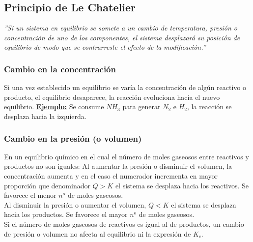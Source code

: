     \subsection{Principio de Le Chatelier}
        \sangria{} \textit{''Si un sistema en equilibrio se somete a un cambio de temperatura, presión o concentración de uno de los componentes, el sistema desplazará su posición de equilibrio de modo que se contrarreste el efecto de la modificación.''} 
        \subsubsection{Cambio en la concentración}
         \sangria{} Si una vez establecido un equilibrio se varía la concentración de algún reactivo o producto, el equilibrio desaparece, la reacción evoluciona hacía el nuevo equilibrio.
        \textbf{\underline{Ejemplo:}}  
        Se consume $NH_3$ para generar $N_2$ e $H_2$, la reacción se desplaza hacia la izquierda.
        \subsubsection{Cambio en la presión (o volumen)}
         \sangria{} En un equilibrio químico en el cual el número de moles gaseosos entre reactivos y productos no son iguales:   \sangria{} Al aumentar la presión o disminuir el volumen, la concentración aumenta y en el caso el numerador incrementa en mayor proporción que denominador $Q>K$ el sistema se desplaza hacia los reactivos. Se favorece el menor $n^o$ de moles gaseosos. \\ \sangria{} Al disminuir la presión o aumentar el volumen, $Q<K$ el sistema se desplaza hacia los productos. Se favorece el mayor $n^o$ de moles gaseosos. \\ \sangria{} Si el número de moles gaseosos de reactivos es igual al de productos, un cambio de presión o volumen no afecta al equilibrio ni la expresión de $K_c$.
